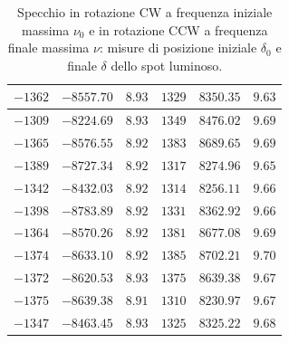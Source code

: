 \documentclass[]{article}
\begin{document}
\begin{table}
\begin{tabular}{||c|c|c||c|c|c||}
            $-1362$ & $-8557.70 $ & $8.93$ & $1329$ & $8350.35$ & $9.63$\\\hline
            $-1309$ & $-8224.69 $ & $8.93$ & $1349$ & $8476.02$ & $9.69$\\\hline
            $-1365$ & $-8576.55 $ & $8.92$ & $1383$ & $8689.65$ & $9.69$\\\hline
            $-1389$ & $-8727.34 $ & $8.92$ & $1317$ & $8274.96$ & $9.65$\\\hline
            $-1342$ & $-8432.03 $ & $8.92$ & $1314$ & $8256.11$ & $9.66$\\\hline
            $-1398$ & $-8783.89 $ & $8.92$ & $1331$ & $8362.92$ & $9.66$\\\hline
            $-1364$ & $-8570.26 $ & $8.92$ & $1381$ & $8677.08$ & $9.69$\\\hline
            $-1374$ & $-8633.10 $ & $8.92$ & $1385$ & $8702.21$ & $9.70$\\\hline
            $-1372$ & $-8620.53 $ & $8.93$ & $1375$ & $8639.38$ & $9.67$\\\hline
            $-1375$ & $-8639.38 $ & $8.91$ & $1310$ & $8230.97$ & $9.67$\\\hline
            $-1347$ & $-8463.45 $ & $8.93$ & $1325$ & $8325.22$ & $9.68$\\\hline
        \end{tabular}
        \caption{Specchio in rotazione CW a frequenza iniziale massima $\nu_0$ e in rotazione CCW a frequenza finale massima $\nu$: misure di posizione iniziale $\delta_0$ e finale $\delta$ dello spot luminoso.}
        \label{CW_CCW-delta-omega}
    \end{table}
\end{document}
